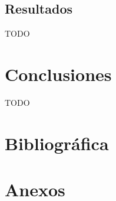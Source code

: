 \documentclass[10pt,a4paper,oneside]{book}
\begin{document}
\newpage
\section{Resultados}
TODO

\newpage
\chapter{Conclusiones}
TODO

\chapter{Bibliográfica}

\cleardoublepage
{}
{}
\listoffigures

\chapter{Anexos}
\end{document}
